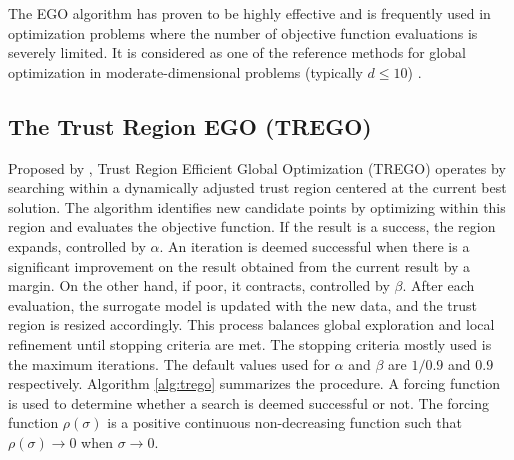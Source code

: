 \documentclass [PhD] {package/uclathes}
\begin{document}
The EGO algorithm has proven to be highly effective and is frequently used in optimization problems where the number of objective function evaluations is severely limited. It is considered as one of the reference methods for global optimization in moderate-dimensional problems (typically \(d \leq 10\)) \parencite{jones2001taxonomy}.

\subsection{The Trust Region EGO (TREGO)}
Proposed by \textcite{diouane2022trego}, Trust Region Efficient Global Optimization (TREGO) operates by searching within a dynamically adjusted trust region centered at the current best solution. The algorithm identifies new candidate points by optimizing within this region and evaluates the objective function.
If the result is a success, the region expands, controlled by \(\alpha\). An iteration is deemed successful when there is a significant improvement on the result obtained from the current result by a margin.
On the other hand, if poor, it contracts, controlled by \(\beta\). After each evaluation, the surrogate model is updated with the new data, and the trust region is resized accordingly. This process balances global exploration and local refinement until stopping criteria are met. The stopping criteria mostly used is the maximum iterations.
The default values used for \(\alpha\) and \(\beta\) are $1/0.9$ and $0.9$ respectively. Algorithm \ref{alg:trego} summarizes the procedure. A forcing function is used to determine whether a search is deemed successful or not. The forcing function $\rho(\sigma)$ is a positive continuous non-decreasing function such that $\rho(\sigma) \rightarrow 0$ when $\sigma \rightarrow 0$.
\end{document}
